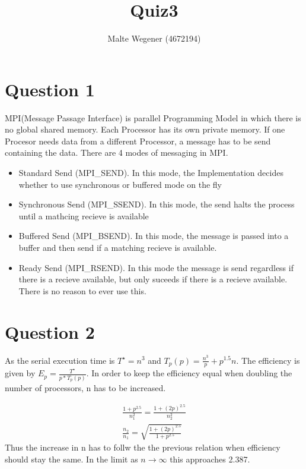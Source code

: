 \documentclass{article}
\begin{document}
\title{Quiz3}
\author{Malte Wegener (4672194)}

\maketitle

\section{Question 1}
MPI(Message Passage Interface) is parallel Programming Model in which there is no global shared memory. Each Processor has its own private memory. If one Procesor needs data from a different Processor, a message has to be send containing the data. There are 4 modes of messaging in MPI.
\begin{itemize}
    \item Standard Send (MPI\_SEND). In this mode, the Implementation decides whether to use synchronous or buffered mode on the fly
    \item Synchronous Send (MPI\_SSEND). In this mode, the send halts the process until a mathcing recieve is available
    \item Buffered Send (MPI\_BSEND). In this mode, the message is passed into a buffer and then send if a matching recieve is available.
    \item Ready Send (MPI\_RSEND). In this mode the message is send regardless if there is a recieve available, but only suceeds if there is a recieve available. There is no reason to ever use this.
\end{itemize}

\section{Question 2}
As the serial execution time is $T^{\star}=n^3$ and $T_p(p) = \frac{n^3}{p}+p^{1.5}n$. The efficiency is given by $E_p = \frac{T^{\star}}{p*T_p(p)}$. In order to keep the efficiency equal when doubling the number of processors, n has to be increased.

\begin{align}
    \frac{1+p^{2.5}}{n_1^2} = \frac{1+(2p)^{2.5}}{n_2^2}\\
    \frac{n_2}{n_1} = \sqrt{\frac{1+(2p)^{2.5}}{1+p^{2.5}}}
\end{align}
Thus the increase in n has to follw the the previous relation when efficiency should stay the same. In the limit as $n \to \infty$ this approaches 2.387.
\end{document}
